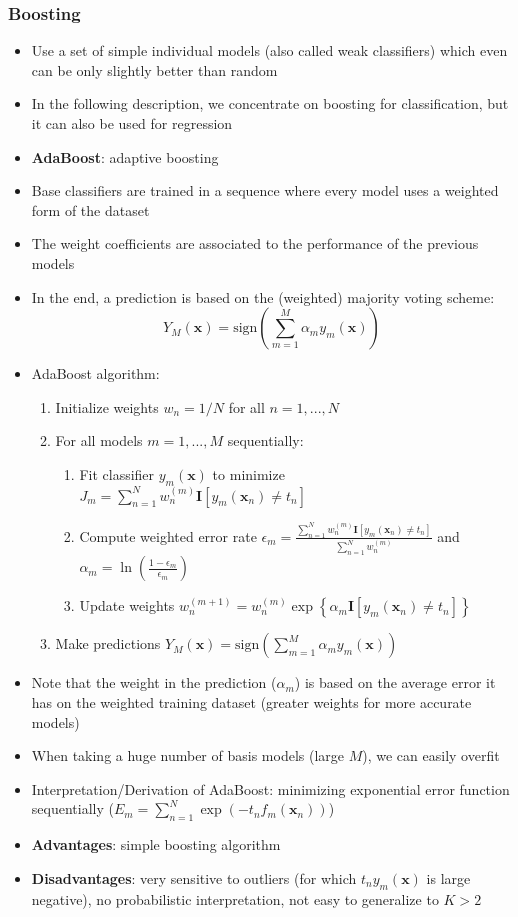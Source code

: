 \subsubsection{Boosting}
\begin{itemize}
	\item Use a set of simple individual models (also called weak classifiers) which even can be only slightly better than random
	\item In the following description, we concentrate on boosting for classification, but it can also be used for regression
	\item \textbf{AdaBoost}: adaptive boosting
	\item Base classifiers are trained in a sequence where every model uses a weighted form of the dataset
	\item The weight coefficients are associated to the performance of the previous models
	\item In the end, a prediction is based on the (weighted) majority voting scheme:
	$$Y_M(\bm{x}) = \text{sign}\left(\sum\limits_{m=1}^{M}\alpha_m y_m(\bm{x})\right)$$
	\item AdaBoost algorithm:
	\begin{enumerate}
		\item Initialize weights $w_n = 1/N$ for all $n=1, ...,N$
		\item For all models $m=1,...,M$ sequentially:
		\begin{enumerate}
			\item Fit classifier $y_m(\bm{x})$ to minimize $J_m = \sum\limits_{n=1}^{N} w_n^{(m)} \bm{I}[y_m(\bm{x}_n)\neq t_n]$
			\item Compute weighted error rate $\epsilon_m = \frac{\sum_{n=1}^{N}w_n^{(m)}\bm{I}[y_m(\bm{x}_n)\neq t_n]}{\sum_{n=1}^{N}w_n^{(m)}}$ and $\alpha_m = \ln\left(\frac{1-\epsilon_m}{\epsilon_m}\right)$
			\item Update weights $w_n^{(m+1)} = w_n^{(m)}\exp\left\{\alpha_m \bm{I}\left[y_m(\bm{x}_n)\neq t_n\right]\right\}$
		\end{enumerate}
		\item Make predictions $Y_M(\bm{x}) = \text{sign}\left(\sum\limits_{m=1}^{M}\alpha_m y_m(\bm{x})\right)$
	\end{enumerate}
	\item Note that the weight in the prediction ($\alpha_m$) is based on the average error it has on the weighted training dataset (greater weights for more accurate models)
	\item When taking a huge number of basis models (large $M$), we can easily overfit
	\item Interpretation/Derivation of AdaBoost: minimizing exponential error function sequentially ($E_m = \sum_{n=1}^{N}\exp\left(-t_n f_m(\bm{x}_n)\right)$)
	\item \textbf{Advantages}: simple boosting algorithm
	\item \textbf{Disadvantages}: very sensitive to outliers (for which $t_n y_m(\bm{x})$ is large negative), no probabilistic interpretation, not easy to generalize to $K > 2$
\end{itemize}
